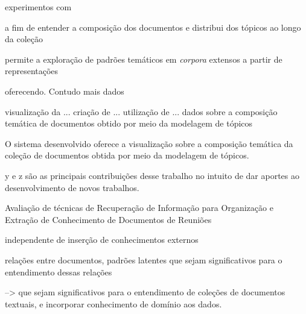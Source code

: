 

















































experimentos com 

a fim de entender a composição dos documentos e distribui dos tópicos ao longo da coleção 

permite a exploração de padrões temáticos em \textit{corpora} extensos a partir de representações 



oferecendo.
 Contudo mais dados 

visualização da ...
criação de ... 
utilização de ...
dados sobre a composição temática de documentos obtido por meio da modelagem de tópicos

O sistema desenvolvido oferece a visualização sobre a composição temática da coleção de documentos obtida por meio da modelagem de tópicos.



y e z são as principais contribuições desse trabalho no intuito de dar aportes ao desenvolvimento de novos trabalhos.  

Avaliação de técnicas de Recuperação de Informação para Organização e Extração de Conhecimento de Documentos de Reuniões 


independente de inserção de conhecimentos externos 


relações entre documentos, padrões latentes que sejam significativos para o entendimento
dessas relações

--> que sejam significativos para o entendimento de coleções de documentos textuais, e incorporar conhecimento de domínio aos dados.




